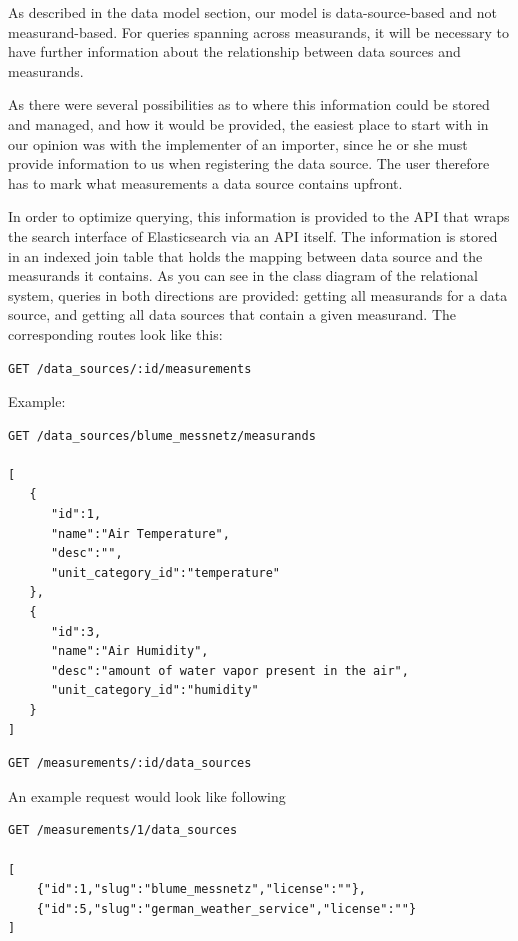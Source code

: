 As described in the data model section, our model is data-source-based
and not measurand-based. For queries spanning across measurands, it will
be necessary to have further information about the relationship between
data sources and measurands.

As there were several possibilities as to where this information could
be stored and managed, and how it would be provided, the easiest place
to start with in our opinion was with the implementer of an importer,
since he or she must provide information to us when registering the data
source. The user therefore has to mark what measurements a data source
contains upfront.

In order to optimize querying, this information is provided to the API
that wraps the search interface of Elasticsearch via an API itself. The
information is stored in an indexed join table that holds the mapping
between data source and the measurands it contains. As you can see in
the class diagram of the relational system, queries
in both directions are provided: getting all measurands for a data
source, and getting all data sources that contain a given measurand. The
corresponding routes look like this:

\begin{verbatim}
GET /data_sources/:id/measurements
\end{verbatim}

Example:

\begin{verbatim}
GET /data_sources/blume_messnetz/measurands

[  
   {  
      "id":1,
      "name":"Air Temperature",
      "desc":"",
      "unit_category_id":"temperature"
   },
   {  
      "id":3,
      "name":"Air Humidity",
      "desc":"amount of water vapor present in the air",
      "unit_category_id":"humidity"
   }
]
\end{verbatim}

\begin{verbatim}
GET /measurements/:id/data_sources
\end{verbatim}

An example request would look like following

\begin{verbatim}
GET /measurements/1/data_sources

[
    {"id":1,"slug":"blume_messnetz","license":""},
    {"id":5,"slug":"german_weather_service","license":""}
]
\end{verbatim}

